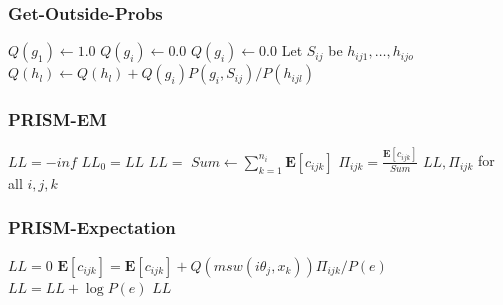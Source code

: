 \documentclass[trans,aspectratio=1610]{beamer}
\newcommand{\defpprog}{\ensuremath{\mathcal{P}}\xspace}
\begin{document}
\begin{frame}
  \frametitle{Get-Outside-Probs}
\begin{algorithmic}[1]
\State   $Q(g_1)\gets 1.0$
  \State   $Q(g_i)\gets 0.0$
\EndFor
{}
  \State   $Q(g_i)\gets 0.0$
    \State Let $S_{ij}$ be $h_{ij1},\ldots,h_{ijo}$
      \State $Q(h_l)\gets Q(h_l)+Q(g_i)P(g_i,S_{ij})/P(h_{ijl})$
    \EndFor
  \EndFor
\EndFor
\EndProcedure
\end{algorithmic}
\end{frame}


\begin{frame}
  \frametitle{PRISM-EM}
\begin{algorithmic}[1]
\Function{PRISM-EM}{$E,\defpprog,\epsilon$}
\State $LL=-\mathit{inf}$
\Repeat
  \State $LL_0=LL$
  \State $LL=$ 
    \State $Sum\gets\sum_{k=1}^{n_i}\mathbf{E}[c_{ijk}]$
      \State $\Pi_{ijk}=\frac{\mathbf{E}[c_{ijk}]}{Sum}$
    \EndFor
  \EndFor
{}
\State\Return  $LL,\Pi_{ijk}$ for all $i,j,k$
\EndFunction
\end{algorithmic}
\end{frame}

\begin{frame}
  \frametitle{PRISM-Expectation}
\begin{algorithmic}[1]
\State $LL=0$
  \State {}
  \State {}
      \State $\mathbf{E}[c_{ijk}]=\mathbf{E}[c_{ijk}]+Q(msw(i\theta_j,x_k))\Pi_{ijk}/P(e)$
    \EndFor
  \EndFor
  \State $LL=LL+\log P(e)$
\EndFor
\State \Return $LL$
\EndFunction
\end{algorithmic}
\end{frame}
\end{document}
